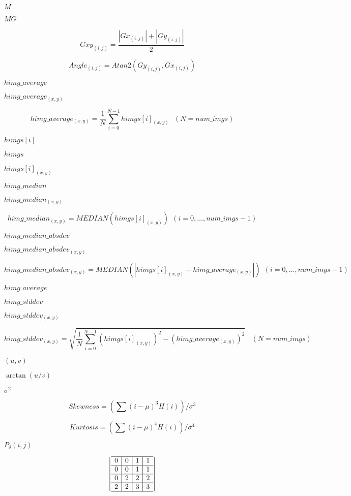 \documentclass{article}
\begin{document}
{$ M $
\pagebreak

$ MG $
\pagebreak

\[ Gxy_{(i,j)} = \frac{|Gx_{(i,j)}| + |Gy_{(i,j)}|}{2} \]
\pagebreak

\[ Angle_{(i,j)} = Atan2( Gy_{(i,j)}, Gx_{(i,j)} ) \]
\pagebreak

$ himg\_average$
\pagebreak

$ himg\_average_{(x,y)} $
\pagebreak

\[ himg\_average_{(x,y)} = \frac{1}{N}\sum_{i=0}^{N-1}{himgs[i]_{(x,y)}}\ \ \ (N=num\_imgs)\]
\pagebreak

$ himgs[i] $
\pagebreak

$ himgs $
\pagebreak

$ himgs[i]_{(x,y)} $
\pagebreak

$ himg\_median$
\pagebreak

$ himg\_median_{(x,y)} $
\pagebreak

\[ himg\_median_{(x,y)} = MEDIAN( himgs[i]_{(x,y)} )\ \ (i=0, \ldots ,num\_imgs-1)\]
\pagebreak

$ himg\_median\_absdev$
\pagebreak

$ himg\_median\_absdev_{(x,y)} $
\pagebreak

\[ himg\_median\_absdev_{(x,y)} = MEDIAN( | himgs[i]_{(x,y)} - himg\_average_{(x,y)} | )\ \ (i=0,\ldots,num\_imgs-1)\]
\pagebreak

$ himg\_average $
\pagebreak

$ himg\_stddev$
\pagebreak

$ himg\_stddev_{(x,y)} $
\pagebreak

\[ himg\_stddev_{(x,y)} = \sqrt{\frac{1}{N}\sum_{i=0}^{N-1}{(himgs[i]_{(x,y)})^2} - ( himg\_average_{(x,y)})^2}\ \ \ \ (N=num\_imgs)\]
\pagebreak

$ (u,v) $
\pagebreak

$ \arctan(u/v) $
\pagebreak

$\sigma^{2}$
\pagebreak

\[ Skewness = \left(\sum \left( i - \mu \right)^{3}H\left( i \right)\right) / \sigma^{3} \]
\pagebreak

\[ Kurtosis = \left(\sum \left( i - \mu \right)^{4}H\left( i \right)\right) / \sigma^{4} \]
\pagebreak

$ P_{\delta }\left(i,j\right) $
\pagebreak

\[ \left| \begin{array}{c|c|c|c} \hline 0 & 0 & 1 & 1 \\ \hline 0 & 0 & 1 & 1 \\ \hline 0 & 2 & 2 & 2 \\ \hline 2 & 2 & 3 & 3 \\ \hline \end{array} \right| \]
\pagebreak

}
\end{document}
